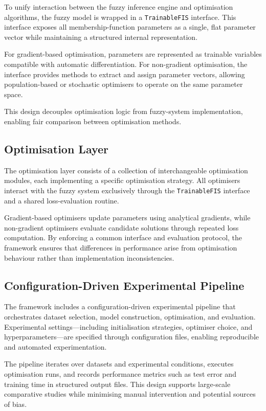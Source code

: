 \documentclass[a4paper,12pt,oneside]{article}
\begin{document}
To unify interaction between the fuzzy inference engine and optimisation algorithms, the fuzzy model is wrapped in a \texttt{TrainableFIS} interface. This interface exposes all membership-function parameters as a single, flat parameter vector while maintaining a structured internal representation.

For gradient-based optimisation, parameters are represented as trainable variables compatible with automatic differentiation. For non-gradient optimisation, the interface provides methods to extract and assign parameter vectors, allowing population-based or stochastic optimisers to operate on the same parameter space.

This design decouples optimisation logic from fuzzy-system implementation, enabling fair comparison between optimisation methods.

\subsection{Optimisation Layer}

The optimisation layer consists of a collection of interchangeable optimisation modules, each implementing a specific optimisation strategy. All optimisers interact with the fuzzy system exclusively through the \texttt{TrainableFIS} interface and a shared loss-evaluation routine.

Gradient-based optimisers update parameters using analytical gradients, while non-gradient optimisers evaluate candidate solutions through repeated loss computation. By enforcing a common interface and evaluation protocol, the framework ensures that differences in performance arise from optimisation behaviour rather than implementation inconsistencies.

\subsection{Configuration-Driven Experimental Pipeline}

The framework includes a configuration-driven experimental pipeline that orchestrates dataset selection, model construction, optimisation, and evaluation. Experimental settings---including initialisation strategies, optimiser choice, and hyperparameters---are specified through configuration files, enabling reproducible and automated experimentation.

The pipeline iterates over datasets and experimental conditions, executes optimisation runs, and records performance metrics such as test error and training time in structured output files. This design supports large-scale comparative studies while minimising manual intervention and potential sources of bias.
\end{document}
